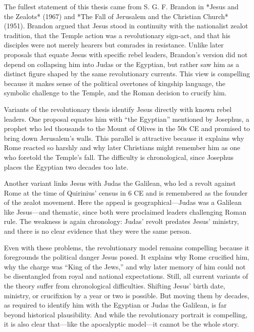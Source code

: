 The fullest statement of this thesis came from S. G. F. Brandon in *Jesus and the Zealots* (1967) and *The Fall of Jerusalem and the Christian Church* (1951).
Brandon argued that Jesus stood in continuity with the nationalist zealot tradition, that the Temple action was a revolutionary sign-act, and that his disciples were not merely hearers but comrades in resistance.
Unlike later proposals that equate Jesus with specific rebel leaders, Brandon’s version did not depend on collapsing him into Judas or the Egyptian, but rather saw him as a distinct figure shaped by the same revolutionary currents.
This view is compelling because it makes sense of the political overtones of kingship language, the symbolic challenge to the Temple, and the Roman decision to crucify him.

Variants of the revolutionary thesis identify Jesus directly with known rebel leaders.
One proposal equates him with “the Egyptian” mentioned by Josephus, a prophet who led thousands to the Mount of Olives in the 50s CE and promised to bring down Jerusalem’s walls.
This parallel is attractive because it explains why Rome reacted so harshly and why later Christians might remember him as one who foretold the Temple’s fall.
The difficulty is chronological, since Josephus places the Egyptian two decades too late.

Another variant links Jesus with Judas the Galilean, who led a revolt against Rome at the time of Quirinius’ census in 6 CE and is remembered as the founder of the zealot movement.
Here the appeal is geographical—Judas was a Galilean like Jesus—and thematic, since both were proclaimed leaders challenging Roman rule.
The weakness is again chronology: Judas’ revolt predates Jesus’ ministry, and there is no clear evidence that they were the same person.

Even with these problems, the revolutionary model remains compelling because it foregrounds the political danger Jesus posed.
It explains why Rome crucified him, why the charge was “King of the Jews,” and why later memory of him could not be disentangled from royal and national expectations.
Still, all current variants of the theory suffer from chronological difficulties.
Shifting Jesus’ birth date, ministry, or crucifixion by a year or two is possible.
But moving them by decades, as required to identify him with the Egyptian or Judas the Galilean, is far beyond historical plausibility.
And while the revolutionary portrait is compelling, it is also clear that—like the apocalyptic model—it cannot be the whole story.

